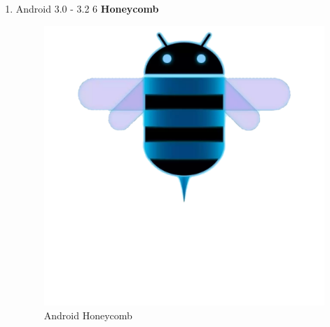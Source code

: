 \begin{enumerate}
\item Android 3.0 - 3.2 6 \textbf{Honeycomb}\\
\begin{figure}[!htbp]
    \centering
    \includegraphics[scale=0.1]{pictures/android-honeycomb.png}
    \caption{Android Honeycomb}
    \label{}
\end{figure}


\end{enumerate}
